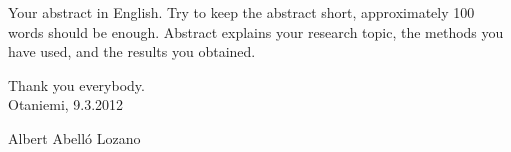 \documentclass[english,12pt,a4paper,pdftex]{article}
\begin{document}


\makecoverpage

\newpage
%
\begin{abstractpage}[english]
 Your abstract in English. Try to keep the abstract short, approximately 
 100 words should be enough. Abstract explains your research topic, 
 the methods you have used, and the results you obtained.  
\end{abstractpage}


Thank you everybody.\\

\vspace{5cm}
Otaniemi, 9.3.2012

\vspace{5mm}
{\hfill Albert Abell\'o Lozano \hspace{1cm}}

\newpage
\end{document}
